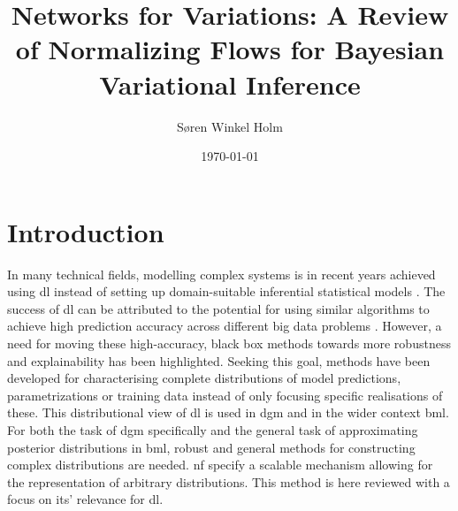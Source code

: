 \documentclass[12pt,fleqn,twocolumn]{article}
\title{Networks for Variations: A Review of Normalizing Flows for Bayesian Variational Inference}
\author{Søren Winkel Holm}
\date{\today}
\begin{document}
\setlength{\headheight}{15pt}
\addtolength{\topmargin}{-2.5pt}

\maketitle
\thispagestyle{fancy}
\section*{Introduction}%
\label{sec:Introduction}
In many technical fields, modelling complex systems is in recent years achieved using \acrfull{dl} instead of setting up domain-suitable inferential statistical models \cite{bzdok2018point, breiman2001stat}.
The success of \acrshort{dl} can be attributed to the potential for using similar algorithms to achieve high prediction accuracy across different big data problems \cite{parloff2016dl}.
However, a need for moving these high-accuracy, black box methods towards more robustness and explainability has been highlighted.
Seeking this goal, methods have been developed for characterising complete distributions of model predictions, parametrizations or training data instead of only focusing specific realisations of these.
This distributional view of \acrshort{dl} is used in \acrfull{dgm} and in the wider context \acrfull{bml}.
For both the task of \acrshort{dgm} specifically and the general task of approximating posterior distributions in \acrshort{bml}, robust and general methods for constructing complex distributions are needed.
\acrfull{nf} specify a scalable mechanism allowing for the representation of arbitrary distributions.
This method is here reviewed with a focus on its' relevance for \acrshort{dl}.
\end{document}
